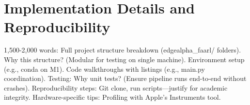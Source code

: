 \section{Implementation Details and Reproducibility}
\label{sec:implement}

1,500-2,000 words: Full project structure breakdown (edgealpha\_faarl/ folders). Why this structure? (Modular for testing on single machine). Environment setup (e.g., conda on M1). Code walkthroughs with listings (e.g., main.py coordination). Testing: Why unit tests? (Ensure pipeline runs end-to-end without crashes). Reproducibility steps: Git clone, run scripts—justify for academic integrity. Hardware-specific tips: Profiling with Apple's Instruments tool.